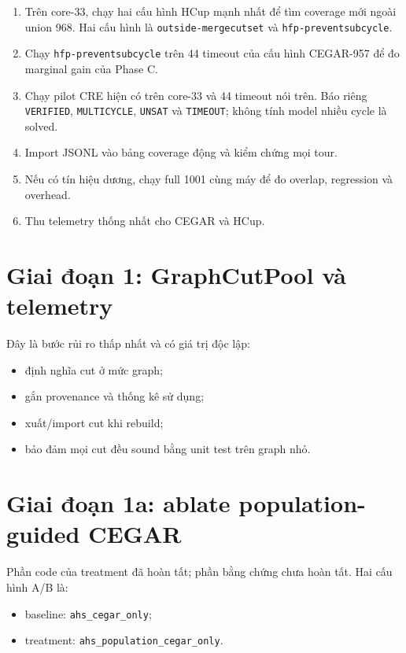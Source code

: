 \documentclass[11pt,a4paper,oneside]{scrreprt}
\newcommand{\code}[1]{\texttt{#1}}
\begin{document}
\begin{enumerate}
  \item Trên core-33, chạy hai cấu hình HCup mạnh nhất để tìm coverage mới ngoài union 968. Hai cấu hình là \code{outside-mergecutset} và \code{hfp-preventsubcycle}.
  \item Chạy \code{hfp-preventsubcycle} trên 44 timeout của cấu hình CEGAR-957 để đo marginal gain của Phase C.
  \item Chạy pilot CRE hiện có trên core-33 và 44 timeout nói trên. Báo riêng \code{VERIFIED}, \code{MULTICYCLE}, \code{UNSAT} và \code{TIMEOUT}; không tính model nhiều cycle là solved.
  \item Import JSONL vào bảng coverage động và kiểm chứng mọi tour.
  \item Nếu có tín hiệu dương, chạy full 1001 cùng máy để đo overlap, regression và overhead.
  \item Thu telemetry thống nhất cho CEGAR và HCup.
\end{enumerate}

\section{Giai đoạn 1: GraphCutPool và telemetry}

Đây là bước rủi ro thấp nhất và có giá trị độc lập:

\begin{itemize}
  \item định nghĩa cut ở mức graph;
  \item gắn provenance và thống kê sử dụng;
  \item xuất/import cut khi rebuild;
  \item bảo đảm mọi cut đều sound bằng unit test trên graph nhỏ.
\end{itemize}

\section{Giai đoạn 1a: ablate population-guided CEGAR}

Phần code của treatment đã hoàn tất; phần bằng chứng chưa hoàn tất. Hai cấu hình A/B là:

\begin{itemize}
  \item baseline: \code{ahs\_cegar\_only};
  \item treatment: \code{ahs\_population\_cegar\_only}.
\end{itemize}
\end{document}
